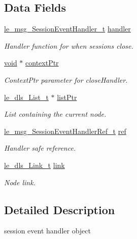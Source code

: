\subsection*{Data Fields}
\begin{DoxyCompactItemize}
\item 
\hyperlink{le__messaging_8h_a2db32a8ef90eced02789aee366c9dda2}{le\+\_\+msg\+\_\+\+Session\+Event\+Handler\+\_\+t} \hyperlink{struct_session_event_handler__t_a4706882f904dc9f7f039e7a364a7fad0}{handler}
\begin{DoxyCompactList}\small\item\em Handler function for when sessions close. \end{DoxyCompactList}\item 
\hyperlink{_t_e_m_p_l_a_t_e__cdef_8h_ac9c84fa68bbad002983e35ce3663c686}{void} $\ast$ \hyperlink{struct_session_event_handler__t_a7cb5fb5caa4ca56ee2ea3d9a2fbafc85}{context\+Ptr}
\begin{DoxyCompactList}\small\item\em Context\+Ptr parameter for close\+Handler. \end{DoxyCompactList}\item 
\hyperlink{structle__dls___list__t}{le\+\_\+dls\+\_\+\+List\+\_\+t} $\ast$ \hyperlink{struct_session_event_handler__t_aaeed5e90adcba3f9fe6f10af085f2c10}{list\+Ptr}
\begin{DoxyCompactList}\small\item\em List containing the current node. \end{DoxyCompactList}\item 
\hyperlink{le__messaging_8h_af86eb84f7043287aafb0a130a9eacf95}{le\+\_\+msg\+\_\+\+Session\+Event\+Handler\+Ref\+\_\+t} \hyperlink{struct_session_event_handler__t_acb78e3740bf80f1c8e1cec9d49994073}{ref}
\begin{DoxyCompactList}\small\item\em Handler safe reference. \end{DoxyCompactList}\item 
\hyperlink{structle__dls___link__t}{le\+\_\+dls\+\_\+\+Link\+\_\+t} \hyperlink{struct_session_event_handler__t_a53ef83c4ea9db4ab538ef7d16700bb37}{link}
\begin{DoxyCompactList}\small\item\em Node link. \end{DoxyCompactList}\end{DoxyCompactItemize}


\subsection{Detailed Description}
session event handler object 

